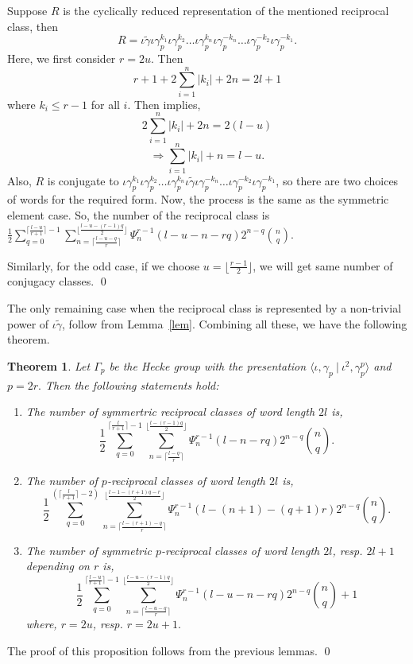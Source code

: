 \documentclass[11pt]{amsart}
\renewenvironment{proof}{{\bfseries Proof.}}{\qed}
\numberwithin{equation}{section}
\newtheorem{thm}[theorem]{Theorem}
\theoremstyle{definition}
\newcommand{\gt}{\tilde{\gamma}}
\newcommand{\imp}{\Rightarrow}
\newcommand{\g}{\gamma_{p}}
\newcommand{\io}{\iota }
\newcommand{\lemref}[1]{Lemma~\ref{#1}}
\numberwithin{equation}{section}
\begin{document}
		\begin{proof}
			Suppose $R$ is the cyclically reduced representation of the mentioned reciprocal class, then \begin{equation} R= \io \gt\io \g^{k_{1}}\io \g^{k_{2}}\dots \io \g^{k_{n}}\io \g^{-k_{n}}\dots\io \g^{-k_{2}}\io \g^{-k_{1}}.\end{equation} 
			Here, we first consider  $r=2u$. Then
			\begin{equation}
				r+1+ 2\sum_{i=1}^{n} |k_{i}| +2n=2l+1
			\end{equation} where $k_{i}\leq r-1$ for all $i$. Then implies,
			\[	 2\sum_{i=1}^{n} |k_{i}| +2n=2(l-u) \]
			\[\imp 	 \sum_{i=1}^{n} |k_{i}| +n=l-u. \]
			Also, $R$ is conjugate to $\io  \g^{k_{1}}\io \g^{k_{2}}\dots \io \g^{k_{n}}\io\gt\io \g^{-k_{n}}\dots\io \g^{-k_{2}}\io \g^{-k_{1}}$, so there are two choices of words for the required form.
			Now, the process is the same as the symmetric element case. So, the number of the reciprocal class is $\frac{1}{2}\sum_{q=0}^{\lceil\frac{l-u}{r+1}\rceil-1} \sum_{n= \lceil\frac{l-u-q}{r}\rceil }^{\lfloor \frac{l-u-(r-1)q}{2}\rfloor}\Psi_{n}^{r-1}(l-u-n-rq)2^{n-q} {n \choose q} $.
			
			
			Similarly, for the odd case, if we choose $u=\lfloor \frac{r-1}{2}\rfloor$, we will get same number of conjugacy classes. 		\end{proof}
		
		
		\medskip 		The only remaining case when the reciprocal class is represented by a non-trivial power of $\io\gt $, follow from \lemref{lem}. Combining all these, we have the following theorem. 
		\begin{thm}\label{count1}
			Let $\Gamma_{p}$ be the Hecke group with the presentation $\langle \io,\g~|~\io^{2},\g^{p}\rangle$ and $p=2r.$ Then the following statements hold:
			\begin{enumerate}
				\item The number of symmertric reciprocal classes of word length $2l$ is, 	$$\frac{1}{2}\sum_{q=0}^{\lceil\frac{l}{r+1}\rceil-1} \sum_{n= \lceil\frac{l-q}{r}\rceil }^{\lfloor \frac{l-(r-1)q}{2}\rfloor}\Psi_{n}^{r-1}(l-n-rq)2^{n-q} {n \choose q}.$$ 
				\item The number of $p$-reciprocal classes of word length $2l$ is,
				$$  \frac{1}{2}\sum_{q=0}^{(\lceil\frac{l}{r+1}\rceil-2)} \sum_{n=\lceil \frac{l-(r+1)-q}{r}\rceil}^{\lfloor\frac{l-1-(r+1)q-r}{2}\rfloor} \Psi_{n}^{r-1}(l-(n+1)-(q+1)r)2^{n-q} {n\choose q} .$$
				
				\item The number of symmetric $ p$-reciprocal classes of word length $2l$, resp. $2l+1$ depending on $r$ is,
				$$\frac{1}{2}\sum_{q=0}^{\lceil\frac{l-u}{r+1}\rceil-1} \sum_{n= \lceil\frac{l-u-q}{r}\rceil }^{\lfloor \frac{l-u-(r-1)q}{2}\rfloor}\Psi_{n}^{r-1}(l-u-n-rq)2^{n-q} {n \choose q} +1$$ where, $r=2u $, resp. $r=2u+1.$
			\end{enumerate}
		\end{thm}
		\begin{proof}
			The proof of this proposition follows from the previous lemmas.
		\end{proof}
\end{document}
